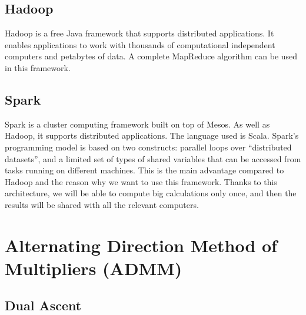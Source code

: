 \itshape\documentclass{article}
\begin{document}
\subsection{Hadoop}
	\label{Hadoop}
	
	Hadoop is a free Java framework that supports distributed applications.  It enables applications to work with thousands of computational independent computers and petabytes of data. A complete MapReduce algorithm can be used in this framework.
	
\subsection{Spark}
	\label{Spark}

	Spark is a cluster computing framework built on top of Mesos. As well as Hadoop, it supports distributed applications. The language used is Scala. 
	Spark's programming model is based on two constructs: parallel loops over ``distributed datasets'', and a limited set of types of shared variables that can be accessed from tasks running on different machines. This is the main advantage compared to Hadoop and the reason why we want to use this framework. Thanks to this architecture, we will be able to compute big calculations only once, and then the results will be shared with all the relevant computers. 


\section{Alternating Direction Method of Multipliers (ADMM)}
	\label{Alternating Direction Method of Multipliers (ADMM)}
	
\subsection{Dual Ascent}
	\label{Dual Ascent}
	
\end{document}
